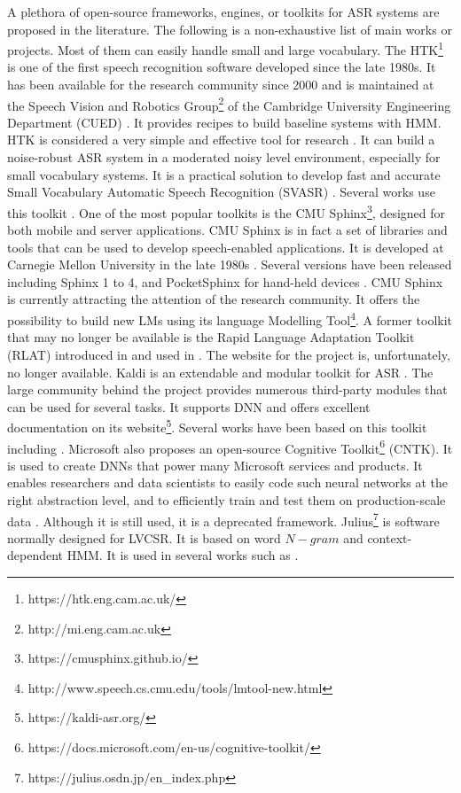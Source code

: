 A plethora of open-source frameworks, engines, or toolkits for ASR systems are proposed in the literature. The following is a non-exhaustive list of main works or projects. Most of them can easily handle small and large vocabulary.  
The HTK\footnote{https://htk.eng.cam.ac.uk/} is one of the first speech recognition software developed since the late 1980s. It has been available for the research community since 2000 and is maintained at the Speech Vision and Robotics Group\footnote{http://mi.eng.cam.ac.uk} of the Cambridge University Engineering Department (CUED) . It provides recipes to build baseline systems with HMM. HTK is considered a very simple and effective tool for research . It can build a noise-robust ASR system in a moderated noisy level environment, especially for small vocabulary systems. It is a practical solution to develop fast and accurate Small Vocabulary Automatic Speech Recognition (SVASR) . Several works use this toolkit .
One of the most popular toolkits is the CMU Sphinx\footnote{https://cmusphinx.github.io/ }, designed for both mobile and server applications. CMU Sphinx is in fact a set of libraries and tools that can be used to develop speech-enabled applications. It is developed at Carnegie Mellon University in the late 1980s . Several versions have been released including Sphinx 1 to 4, and PocketSphinx for hand-held devices . CMU Sphinx is currently attracting the attention of the research community. It offers the possibility to build new LMs using its language Modelling Tool\footnote{http://www.speech.cs.cmu.edu/tools/lmtool-new.html }.
A former toolkit that may no longer be available is the Rapid Language Adaptation Toolkit (RLAT) introduced in  and used in . The website for the project is, unfortunately, no longer available. 
Kaldi is an extendable and modular toolkit for ASR . The large community behind the project provides numerous third-party modules that can be used for several tasks. It supports DNN and offers excellent documentation on its website\footnote{https://kaldi-asr.org/}. Several works have been based on this toolkit including . 
Microsoft also proposes an open-source Cognitive Toolkit\footnote{https://docs.microsoft.com/en-us/cognitive-toolkit/} (CNTK). It is used to create DNNs that power many Microsoft services and products. It enables researchers and data scientists to easily code such neural networks at the right abstraction level, and to efficiently train and test them on production-scale data . Although it is still used, it is a deprecated framework.
Julius\footnote{https://julius.osdn.jp/en\_index.php} is software normally designed for LVCSR. It is based on word $N-gram$ and context-dependent HMM. It is used in several works such as . 
